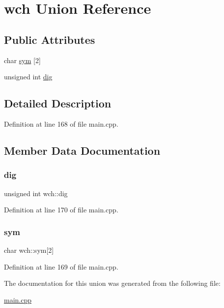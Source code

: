 \hypertarget{unionwch}{}\section{wch Union Reference}
\label{unionwch}
\subsection*{Public Attributes}
\begin{DoxyCompactItemize}
\item 
char \hyperlink{unionwch_af55b442864f410a46904f7fb15c1ca3a}{sym} \mbox{[}2\mbox{]}
\item 
unsigned int \hyperlink{unionwch_aa8de173ef97cc017c30e24819ab3a10a}{dig}
\end{DoxyCompactItemize}


\subsection{Detailed Description}


Definition at line 168 of file main.\+cpp.



\subsection{Member Data Documentation}
\mbox{\label{unionwch_aa8de173ef97cc017c30e24819ab3a10a}} 
\subsubsection{\texorpdfstring{dig}{dig}}
{\footnotesize\ttfamily unsigned int wch\+::dig}



Definition at line 170 of file main.\+cpp.

\mbox{\label{unionwch_af55b442864f410a46904f7fb15c1ca3a}} 
\subsubsection{\texorpdfstring{sym}{sym}}
{\footnotesize\ttfamily char wch\+::sym\mbox{[}2\mbox{]}}



Definition at line 169 of file main.\+cpp.



The documentation for this union was generated from the following file\+:\begin{DoxyCompactItemize}
\item 
\hyperlink{main_8cpp}{main.\+cpp}\end{DoxyCompactItemize}
